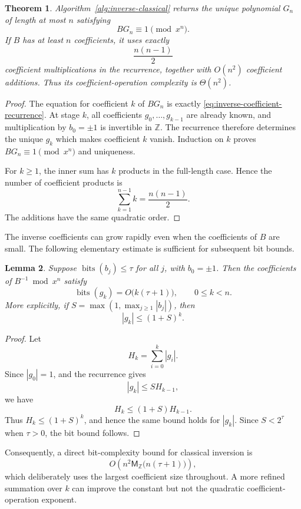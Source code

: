 \documentclass[11pt]{book}
\newtheorem{theorem}{Theorem}[section]
\newtheorem{lemma}[theorem]{Lemma}
\theoremstyle{definition}
\newcommand{\ZZ}{\mathbb Z}
\newcommand{\bits}{\operatorname{bits}}
\newcommand{\MZ}{\mathsf M_{\ZZ}}
\begin{document}
\begin{theorem}\label{thm:inverse-classical-correctness}
Algorithm~\ref{alg:inverse-classical} returns the unique polynomial $G_n$ of
length at most $n$ satisfying
\[
 BG_n\equiv1\pmod{x^n}.
\]
If $B$ has at least $n$ coefficients, it uses exactly
\[
 \frac{n(n-1)}2
\]
coefficient multiplications in the recurrence, together with $O(n^2)$
coefficient additions.  Thus its coefficient-operation complexity is
$\Theta(n^2)$.
\end{theorem}

\begin{proof}
The equation for coefficient $k$ of $BG_n$ is exactly
\eqref{eq:inverse-coefficient-recurrence}.  At stage $k$, all coefficients
$g_0,\ldots,g_{k-1}$ are already known, and multiplication by $b_0=\pm1$ is
invertible in $\ZZ$.  The recurrence therefore determines the unique $g_k$
which makes coefficient $k$ vanish.  Induction on $k$ proves
$BG_n\equiv1\pmod{x^n}$ and uniqueness.

For $k\geq1$, the inner sum has $k$ products in the full-length case.  Hence
the number of coefficient products is
\[
 \sum_{k=1}^{n-1}k=\frac{n(n-1)}2.
\]
The additions have the same quadratic order.
\end{proof}

The inverse coefficients can grow rapidly even when the coefficients of $B$
are small.  The following elementary estimate is sufficient for subsequent bit
bounds.

\begin{lemma}\label{lem:inverse-coefficient-growth}
Suppose $\bits(b_j)\leq\tau$ for all $j$, with $b_0=\pm1$.  Then the
coefficients of $B^{-1}\bmod x^n$ satisfy
\[
 \bits(g_k)=O\bigl(k(\tau+1)\bigr),
 \qquad 0\leq k<n.
\]
More explicitly, if $S=\max(1,\max_{j\geq1}|b_j|)$, then
\[
 |g_k|\leq(1+S)^k.
\]
\end{lemma}

\begin{proof}
Let
\[
 H_k=\sum_{i=0}^{k}|g_i|.
\]
Since $|g_0|=1$, and the recurrence gives
\[
 |g_k|\leq S H_{k-1},
\]
we have
\[
 H_k\leq(1+S)H_{k-1}.
\]
Thus $H_k\leq(1+S)^k$, and hence the same bound holds for $|g_k|$.  Since
$S<2^\tau$ when $\tau>0$, the bit bound follows.
\end{proof}

Consequently, a direct bit-complexity bound for classical inversion is
\[
 O\!\left(
 n^2\MZ\bigl(n(\tau+1)\bigr)
 \right),
\]
which deliberately uses the largest coefficient size throughout.  A more
refined summation over $k$ can improve the constant but not the quadratic
coefficient-operation exponent.
\end{document}
